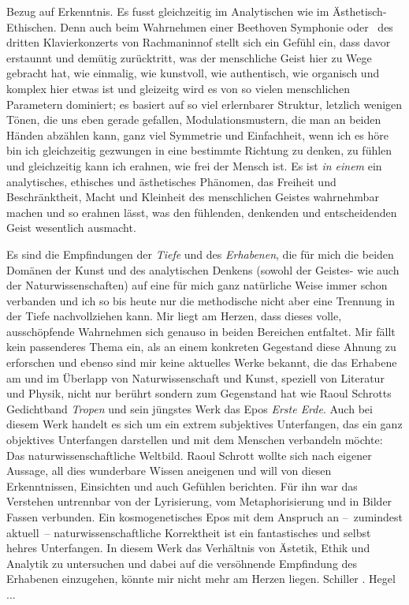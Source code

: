   Bezug auf Erkenntnis.
Es fusst gleichzeitig im Analytischen wie im Ästhetisch-Ethischen.
Denn auch beim Wahrnehmen einer Beethoven Symphonie oder \zB\ des dritten
  Klavierkonzerts von Rachmaninnof stellt sich ein Gefühl ein, dass davor
  erstaunnt und demütig zurücktritt, was der menschliche Geist hier zu Wege
  gebracht hat, wie einmalig, wie kunstvoll, wie authentisch, wie organisch
  und komplex hier etwas ist und gleizeitg wird es von so vielen menschlichen
  Parametern dominiert; es basiert auf so viel erlernbarer Struktur, letzlich
  wenigen Tönen, die uns eben gerade gefallen, Modulationsmustern, die man an
  beiden Händen abzählen kann, ganz viel Symmetrie und Einfachheit, wenn ich
  es höre bin ich gleichzeitig gezwungen in eine bestimmte Richtung zu denken, zu
  fühlen und gleichzeitig kann ich erahnen, wie frei der Mensch ist.
Es ist \emph{in einem} ein analytisches, ethisches und ästhetisches
  Phänomen, das Freiheit und Beschränktheit, Macht und Kleinheit des
  menschlichen Geistes wahrnehmbar machen und so erahnen lässt, was den
  fühlenden, denkenden und entscheidenden Geist wesentlich ausmacht.

Es sind die Empfindungen der \emph{Tiefe} und des \emph{Erhabenen}, die für
  mich die beiden Domänen der Kunst und des analytischen Denkens (sowohl der
  Geistes- wie auch der Naturwissenschaften) auf eine für mich ganz natürliche Weise
  immer schon verbanden und ich so bis heute nur die methodische nicht aber eine
  Trennung in der Tiefe nachvollziehen kann.
Mir liegt am Herzen, dass dieses volle, ausschöpfende Wahrnehmen sich genauso
  in beiden Bereichen entfaltet.
Mir fällt kein passenderes Thema ein, als an einem konkreten Gegestand diese
  Ahnung zu erforschen und ebenso sind mir keine aktuelles Werke bekannt, die das
  Erhabene am und im Überlapp von Naturwissenschaft und Kunst, speziell von
  Literatur und Physik, nicht nur berührt sondern zum Gegenstand hat wie Raoul
  Schrotts Gedichtband \emph{Tropen} und sein jüngstes Werk das Epos \emph{Erste Erde}.
Auch bei diesem Werk handelt es sich um ein extrem subjektives Unterfangen,
  das ein ganz objektives Unterfangen darstellen und mit dem Menschen
  verbandeln möchte: Das naturwissenschaftliche Weltbild. Raoul Schrott wollte
  sich nach eigener Aussage, all dies wunderbare Wissen aneigenen und will von
  diesen Erkenntnissen, Einsichten und auch Gefühlen berichten. Für ihn war
  das Verstehen untrennbar von der Lyrisierung, vom Metaphorisierung und in
  Bilder Fassen verbunden. Ein kosmogenetisches Epos mit dem Anspruch an
  --~zumindest aktuell~-- naturwissenschaftliche Korrektheit ist ein
  fantastisches und selbst hehres Unterfangen.
In diesem Werk das Verhältnis von Ästetik, Ethik und Analytik zu untersuchen
  und dabei auf die versöhnende Empfindung des Erhabenen einzugehen, könnte
  mir nicht mehr am Herzen liegen. 
Schiller \citep[S. 4]{SchillerNaiveDichtung}. Hegel ...


